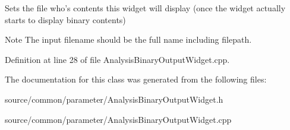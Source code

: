 Sets the file who's contents this widget will display (once the widget actually starts to display binary contents) 

\begin{DoxyNote}{Note}
The input filename should be the full name including filepath. 
\end{DoxyNote}


Definition at line 28 of file Analysis\-Binary\-Output\-Widget.\-cpp.



The documentation for this class was generated from the following files\-:\begin{DoxyCompactItemize}
\item 
source/common/parameter/Analysis\-Binary\-Output\-Widget.\-h\item 
source/common/parameter/Analysis\-Binary\-Output\-Widget.\-cpp\end{DoxyCompactItemize}
